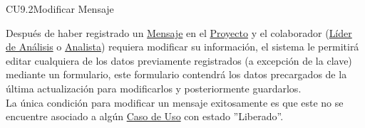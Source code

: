 	\begin{UseCase}{CU9.2}{Modificar Mensaje}{
			
			Después de haber registrado un \hyperlink{MSGEntidad}{Mensaje} en el \hyperlink{proyectoEntidad}{Proyecto} y el colaborador (\hyperlink{jefe}{Líder de Análisis} o \hyperlink{analista}{Analista}) requiera modificar su información, el sistema le permitirá editar cualquiera de los datos previamente registrados (a excepción de la clave) mediante un formulario, este formulario contendrá los datos precargados de la última actualización para modificarlos y posteriormente guardarlos.\\
			
			La única condición para modificar un mensaje exitosamente es que este no se encuentre asociado a algún \hyperlink{casoUso}{Caso de Uso} con estado ”Liberado”.
			
}
\end{UseCase}
